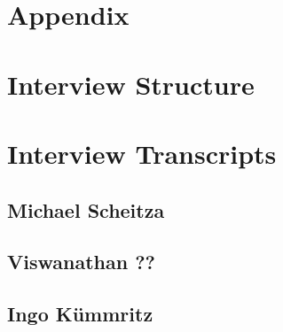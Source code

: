 \begin{appendix}
\section*{Appendix}
\label{Appendix}	
\tocless\section{Interview Structure}

\tocless\section{Interview Transcripts}

\tocless\subsection{Michael Scheitza}

\tocless\subsection{Viswanathan ??}

\tocless\subsection{Ingo Kümmritz}
	
\end{appendix}	